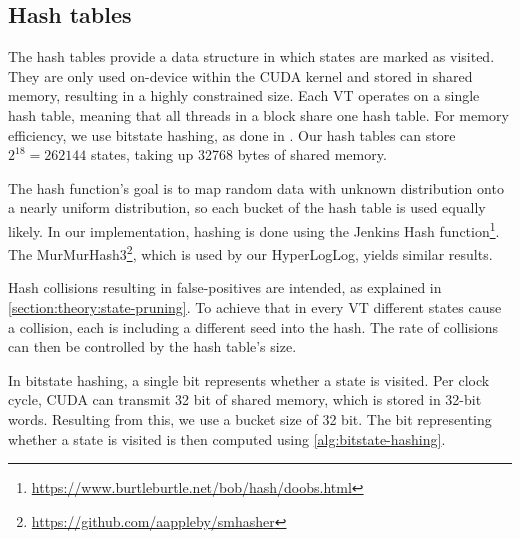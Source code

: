 \documentclass[
fancyheadings, %
%
%
]{stsreprt}
\begin{document}

\subsection{Hash tables}

The hash tables provide a data structure in which states are marked as visited.
They are only used on-device within the CUDA kernel and stored in shared memory, resulting in a highly constrained size.
Each VT operates on a single hash table, meaning that all threads in a block share one hash table.
For memory efficiency, we use bitstate hashing, as done in \cite{DeFrancisco2020.Grapple}.
Our hash tables can store $2^{18}=\num{262144}$ states, taking up \num{32768} bytes of shared memory.

The hash function's goal is to map random data with unknown distribution onto a nearly uniform distribution, so each bucket of the hash table is used equally likely.
In our implementation, hashing is done using the Jenkins Hash function\footnote{\url{https://www.burtleburtle.net/bob/hash/doobs.html}}.
The MurMurHash3\footnote{\url{https://github.com/aappleby/smhasher}}, which is used by our HyperLogLog, yields similar results.

Hash collisions resulting in false-positives are intended, as explained in \cref{section:theory:state-pruning}.
To achieve that in every VT different states cause a collision, each is including a different seed into the hash.
The rate of collisions can then be controlled by the hash table's size.

In bitstate hashing, a single bit represents whether a state is visited.
Per clock cycle, CUDA can transmit 32 bit of shared memory, which is stored in 32-bit words.
Resulting from this, we use a bucket size of 32 bit.
The bit representing whether a state is visited is then computed using \cref{alg:bitstate-hashing}.
\end{document}
